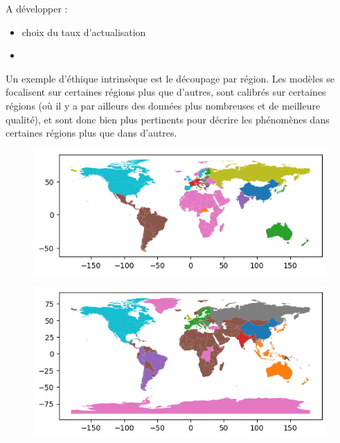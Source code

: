 \begin{tcolorbox}
    A développer : 
    \begin{itemize}
        \item choix du taux d'actualisation
        \item 
    \end{itemize}
\end{tcolorbox}

Un exemple d'éthique intrinsèque est le découpage par région. Les modèles se focalisent sur certaines régions plus que d'autres, sont calibrés sur certaines régions (où il y a par ailleurs des données plus nombreuses et de meilleure qualité), et sont donc bien plus pertinents pour décrire les phénomènes dans certaines régions plus que dans d'autres. 

\begin{figure}[htbp]
    \centering
    \begin{minipage}{0.45\textwidth}
        \centering
        \includegraphics[width=\linewidth]{figures/FUND_regions.png} %
        \label{fig:carte1}
    \end{minipage}%
    \hfill
    \begin{minipage}{0.45\textwidth}
        \centering
        \includegraphics[width=\linewidth]{figures/WILIAM_regions.png} %
        \label{fig:carte2}
    \end{minipage}%
    \label{fig:trois_cartes}
\end{figure} 



